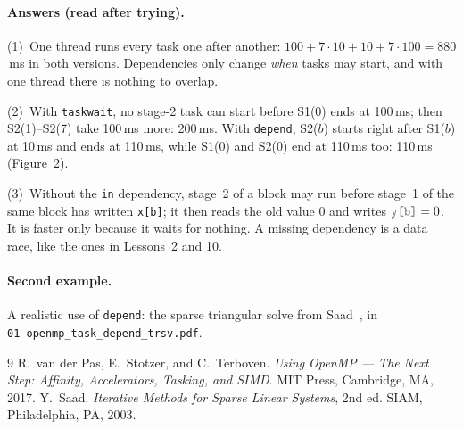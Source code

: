 \documentclass[11pt,a4paper]{article}
\let\origtexttt\texttt
\renewcommand{\texttt}[1]{\textcolor{black!60}{\origtexttt{#1}}}
\begin{document}
\paragraph{Answers (read after trying).}

\noindent(1)~One thread runs every task one after another: $100 + 7\cdot10 + 10 + 7\cdot100 =
880$\,ms in both versions. Dependencies only change \emph{when} tasks may start, and with one
thread there is nothing to overlap.

\noindent(2)~With \texttt{taskwait}, no stage-2 task can start before S1(0) ends at 100\,ms;
then S2(1)--S2(7) take 100\,ms more: 200\,ms. With \texttt{depend}, S2($b$) starts right after
S1($b$) at 10\,ms and ends at 110\,ms, while S1(0) and S2(0) end at 110\,ms too: 110\,ms
(Figure~2).

\noindent(3)~Without the \texttt{in} dependency, stage~2 of a block may run before stage~1 of the
same block has written \texttt{x[b]}; it then reads the old value 0 and writes
$\texttt{y[b]} = 0$. It is faster only because it waits for nothing. A missing dependency is
a data race, like the ones in Lessons~2 and 10.

\paragraph{Second example.} A realistic use of \texttt{depend}: the sparse triangular solve
from Saad~\cite{saad}, in\\ \texttt{01-openmp\_task\_depend\_trsv.pdf}.

\begin{thebibliography}{9}
 R.~van der Pas, E.~Stotzer, and C.~Terboven. \emph{Using OpenMP --- The Next
  Step: Affinity, Accelerators, Tasking, and SIMD}. MIT Press, Cambridge, MA, 2017.
 Y.~Saad. \emph{Iterative Methods for Sparse Linear Systems}, 2nd ed. SIAM,
  Philadelphia, PA, 2003.
\end{thebibliography}
\end{document}

